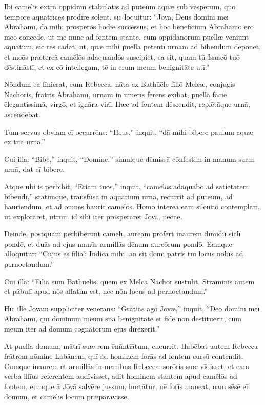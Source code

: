 \Versus Ibi camēlīs extrā oppidum stabulātīs ad puteum aquæ sub vesperum, quō tempore aquatrīcēs prōdīre solent,
\Versus sīc loquitur: ``Jōva, Deus dominī meī Abrāhāmī, dā mihi prōsperōs hodiē successūs, et hoc beneficium Abrāhāmō erō meō concēde,
\Versus ut mē nunc ad fontem stante, cum oppidānōrum puellæ veniunt aquātum, sīc rēs cadat,
\Versus ut, quæ mihi puella petentī urnam ad bibendum dēpōnet, et meōs prætereā camēlōs adaquandōs suscipiet, ea sit, quam tū Isaacō tuō dēstināstī, et ex eō intellegam, tē in erum meum benignitāte utī.''

\Versus Nōndum ea fīnierat, cum Rebecca, nāta ex Bathūēle fīliō Melcæ, conjugis Nachōris, frātris Abrāhāmī, urnam in umerīs ferēns exībat,
\Versus puella faciē ēlegantissimā, virgō, et ignāra virī. Hæc ad fontem dēscendit, replētāque urnā, ascendēbat.

\Versus Tum servus obviam eī occurrēns: ``Heus,'' inquit, ``dā mihi bibere paulum aquæ ex tuā urnā.''

\Versus Cui illa: ``Bibe,'' inquit, ``Domine,'' simulque dēmissā cōnfestim in manum suam urnā, dat eī bibere.

\Versus Atque ubi is perbibit, ``Etiam tuōs,'' inquit, ``camēlōs adaquābō ad satietātem bibendī,''
\Versus statimque, trānsfūsā in aquārium urnā, recurrit ad puteum, ad hauriendum, et ad omnēs haurit camēlōs.
\Versus Homō intereā eam silentiō contemplārī, ut explōrāret, utrum id sibi iter prosperāret Jōva, necne.

\Versus Deinde, postquam perbibērunt camēlī, auream prōfert inaurem dīmidiī siclī pondō, et duās ad ejus manūs armillās dēnum aureōrum pondō.
\Versus Eamque alloquitur: ``Cujus es fīlia? Indicā mihi, an sit domī patris tuī locus nōbīs ad pernoctandum.''

\Versus Cui illa: ``Fīlia sum Bathūēlis, quem ex Melcā Nachor sustulit.
\Versus Strāminis autem et pābulī apud nōs affatim est, nec nōn locus ad pernoctandum.''

\Versus Hīc ille Jōvam suppliciter venerāns: ``Grātiās agō Jōvæ,''
\Versus inquit, ``Deō dominī meī Abrāhāmī, quī dominum meum suā benignitāte et fidē nōn dēstituerit, cum meum iter ad domum cognātōrum ejus dīrēxerit.''

\Versus At puella domum, mātrī suæ rem ēnūntiātum, cucurrit.
\Versus Habēbat autem Rebecca frātrem nōmine Labānem, quī ad hominem forās ad fontem cursū contendit.
\Versus Cumque inaurem et armillās in manibus Rebeccæ sorōris suæ vīdisset, et eam verba illīus referentem audīvisset, adit hominem stantem apud camēlōs ad fontem,
\Versus eumque ā Jōvā salvēre jussum, hortātur, nē forīs maneat, nam sēsē eī domum, et camēlīs locum præparāvisse.

